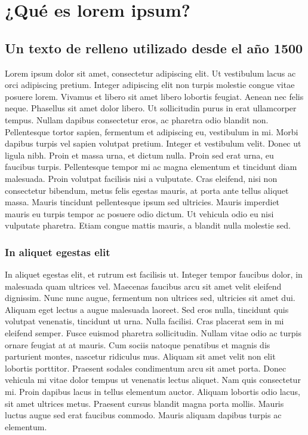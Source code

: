 \documentclass[11pt, a4paper]{report}
\begin{document}
\chapter{¿Qué es lorem ipsum?}






\section[Texto de relleno]{Un texto de relleno utilizado desde el año 1500}

Lorem ipsum dolor sit amet, consectetur adipiscing elit. Ut vestibulum lacus ac orci adipiscing pretium. Integer adipiscing elit non turpis molestie congue vitae posuere lorem. Vivamus et libero sit amet libero lobortis feugiat. Aenean nec felis neque. Phasellus sit amet dolor libero. Ut sollicitudin purus in erat ullamcorper tempus. Nullam dapibus consectetur eros, ac pharetra odio blandit non. Pellentesque tortor sapien, fermentum et adipiscing eu, vestibulum in mi. Morbi dapibus turpis vel sapien volutpat pretium. Integer et vestibulum velit. Donec ut ligula nibh. Proin et massa urna, et dictum nulla. Proin sed erat urna, eu faucibus turpis. Pellentesque tempor mi ac magna elementum et tincidunt diam malesuada. Proin volutpat facilisis nisi a vulputate. Cras eleifend, nisi non consectetur bibendum, metus felis egestas mauris, at porta ante tellus aliquet massa. Mauris tincidunt pellentesque ipsum sed ultricies. Mauris imperdiet mauris eu turpis tempor ac posuere odio dictum. Ut vehicula odio eu nisi vulputate pharetra. Etiam congue mattis mauris, a blandit nulla molestie sed.





\subsection{In aliquet egestas elit}
In aliquet egestas elit, et rutrum est facilisis ut. Integer tempor faucibus dolor, in malesuada quam ultrices vel. Maecenas faucibus arcu sit amet velit eleifend dignissim. Nunc nunc augue, fermentum non ultrices sed, ultricies sit amet dui. Aliquam eget lectus a augue malesuada laoreet. Sed eros nulla, tincidunt quis volutpat venenatis, tincidunt ut urna. Nulla facilisi. Cras placerat sem in mi eleifend semper. Fusce euismod pharetra sollicitudin. Nullam vitae odio ac turpis ornare feugiat at at mauris. Cum sociis natoque penatibus et magnis dis parturient montes, nascetur ridiculus mus. Aliquam sit amet velit non elit lobortis porttitor. Praesent sodales condimentum arcu sit amet porta. Donec vehicula mi vitae dolor tempus ut venenatis lectus aliquet. Nam quis consectetur mi. Proin dapibus lacus in tellus elementum auctor. Aliquam lobortis odio lacus, sit amet ultrices metus. Praesent cursus blandit magna porta mollis. Mauris luctus augue sed erat faucibus commodo. Mauris aliquam dapibus turpis ac elementum.
\end{document}
